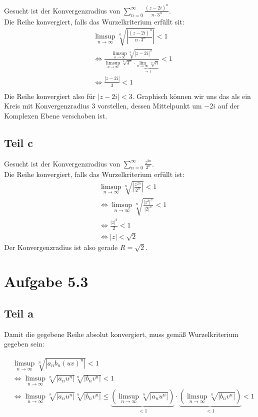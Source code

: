 \documentclass[a4paper,german,12pt,smallheadings]{scrartcl}
\begin{document}
Gesucht ist der Konvergenzradius von $\sum\limits_{n=0}^{\infty} \frac{(z-2i)^n}{n\cdot3^n}$.\\
Die Reihe konvergiert, falls das Wurzelkriterium erfüllt sit:
\begin{align*}
  & \limsup_{n \to \infty} \sqrt[n]{\left|\frac{(z-2i)^n}{n\cdot3^n}\right|}<1\\
  & \Leftrightarrow \frac{\limsup\limits_{n \to \infty} \sqrt[n]{|z-2i|^n}}{\limsup\limits_{n \to \infty} \sqrt[n]{3^n} \cdot \underbrace{\lim_{n \to \infty} \sqrt[n]{n}}_{\to 1}} < 1\\
  & \Leftrightarrow \frac{|z-2i|}{3} < 1\\
\end{align*}
Die Reihe konvergiert also für $|z-2i| < 3$. Graphisch können wir uns das als ein Kreis mit Konvergenzradius 3 vorstellen, dessen Mittelpunkt um $-2i$ auf der Komplexen Ebene verschoben ist.

\subsection*{Teil c}
Gesucht ist der Konvergenzradius von $\sum\limits_{n=0}^{\infty} \frac{z^{2n}}{2^n}$.\\
Die Reihe konvergiert, falls das Wurzelkriterium erfüllt ist:
\begin{align*}
  & \limsup\limits_{n \to \infty} \sqrt[n]{|\frac{z^{2n}}{2^n}|}<1\\
  & \Leftrightarrow \limsup\limits_{n \to \infty} \sqrt[n]{\frac{{|z^2|}^n}{|2|^n}}<1\\
  & \Leftrightarrow \frac{|z|^2}{2}<1\\
  & \Leftrightarrow |z|<\sqrt{2}
  \end{align*}
Der Konvergenzradius ist also gerade $R=\sqrt{2}$.

\section*{Aufgabe 5.3}
\subsection*{Teil a}

Damit die gegebene Reihe absolut konvergiert, muss gemäß Wurzelkriterium gegeben sein:

\begin{align*}
  &\limsup_{n \to \infty} \sqrt[n]{|a_nb_n(uv)^n|} < 1 \\
  &\Leftrightarrow \limsup_{n \to \infty} \sqrt[n]{|a_nu^n|} \sqrt[n]{|b_nv^n|} < 1 \\
  &\Leftrightarrow \limsup_{n \to \infty} \sqrt[n]{|a_nu^n|} \sqrt[n]{|b_nv^n|} \leq \underbrace{\left(\limsup_{n \to \infty} \sqrt[n]{|a_nu^n|}\right)}_{<1} \cdot \underbrace{\left(\limsup_{n \to \infty} \sqrt[n]{|b_nv^n|}\right)}_{<1} < 1 \\
\end{align*}
\end{document}
